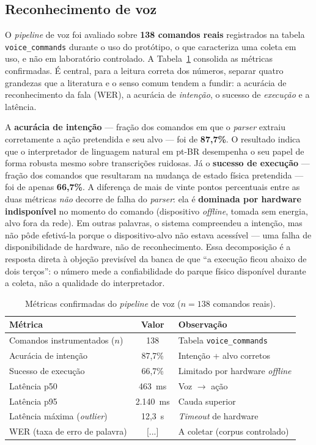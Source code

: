 \subsection{Reconhecimento de voz}\label{sec:res-voz}

O \textit{pipeline} de voz foi avaliado sobre \textbf{138 comandos reais} registrados na
tabela \texttt{voice\_commands} durante o uso do protótipo, o que caracteriza uma
coleta em uso, e não em laboratório controlado. A Tabela~\ref{tab:voz} consolida as
métricas confirmadas. É central, para a leitura correta dos números, separar quatro
grandezas que a literatura e o senso comum tendem a fundir: a acurácia de reconhecimento
da fala (WER), a acurácia de \textit{intenção}, o sucesso de \textit{execução} e a
latência.

A \textbf{acurácia de intenção} --- fração dos comandos em que o \textit{parser}
extraiu corretamente a ação pretendida e seu alvo --- foi de \textbf{87,7\%}. O
resultado indica que o interpretador de linguagem natural em pt-BR desempenha o seu
papel de forma robusta mesmo sobre transcrições ruidosas. Já o \textbf{sucesso de
execução} --- fração dos comandos que resultaram na mudança de estado física
pretendida --- foi de apenas \textbf{66,7\%}. A diferença de mais de vinte pontos
percentuais entre as duas métricas \emph{não} decorre de falha do \textit{parser}: ela
é \textbf{dominada por hardware indisponível} no momento do comando (dispositivo
\textit{offline}, tomada sem energia, alvo fora da rede). Em outras palavras, o sistema
compreendeu a intenção, mas não pôde efetivá-la porque o dispositivo-alvo não estava
acessível --- uma falha de disponibilidade de hardware, não de reconhecimento. Essa
decomposição é a resposta direta à objeção previsível da banca de que ``a execução
ficou abaixo de dois terços'': o número mede a confiabilidade do parque físico
disponível durante a coleta, não a qualidade do interpretador.

\begin{table}[H]
\centering
\caption{Métricas confirmadas do \textit{pipeline} de voz ($n=138$ comandos reais).}
\label{tab:voz}
\begin{tabular}{@{}lcl@{}}
\toprule
\textbf{Métrica} & \textbf{Valor} & \textbf{Observação} \\
\midrule
Comandos instrumentados ($n$) & 138      & Tabela \texttt{voice\_commands} \\
Acurácia de intenção          & 87,7\%   & Intenção + alvo corretos \\
Sucesso de execução           & 66,7\%   & Limitado por hardware \textit{offline} \\
Latência p50                  & 463~ms   & Voz $\rightarrow$ ação \\
Latência p95                  & 2.140~ms & Cauda superior \\
Latência máxima (\textit{outlier}) & 12,3~s & \textit{Timeout} de hardware \\
WER (taxa de erro de palavra) & [...]    & A coletar (corpus controlado) \\
\bottomrule
\end{tabular}
\end{table}

